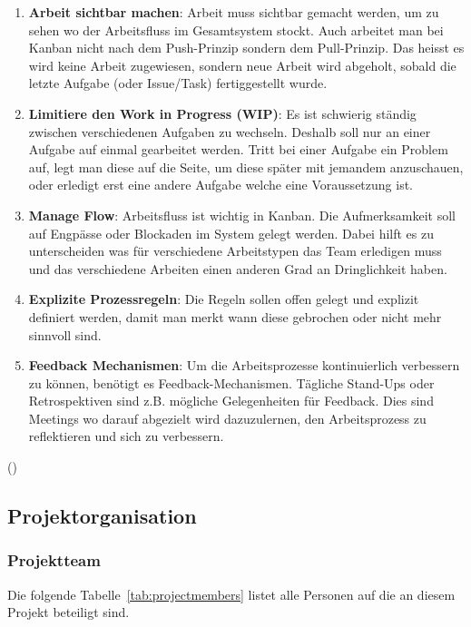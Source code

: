 \begin{enumerate}
    \item \textbf{Arbeit sichtbar machen}: Arbeit muss sichtbar gemacht werden, um zu sehen wo der Arbeitsfluss im Gesamtsystem stockt.
        Auch arbeitet man bei Kanban nicht nach dem Push-Prinzip sondern dem Pull-Prinzip.
        Das heisst es wird keine Arbeit zugewiesen, sondern neue Arbeit wird abgeholt, sobald die letzte Aufgabe (oder Issue/Task) fertiggestellt wurde.
    \item \textbf{Limitiere den Work in Progress (WIP)}: Es ist schwierig ständig zwischen verschiedenen Aufgaben zu wechseln. Deshalb soll nur an einer Aufgabe auf einmal gearbeitet werden.
    Tritt bei einer Aufgabe ein Problem auf, legt man diese auf die Seite, um diese später mit jemandem anzuschauen, oder erledigt erst eine andere Aufgabe welche eine Voraussetzung ist.
    \item \textbf{Manage Flow}: Arbeitsfluss ist wichtig in Kanban.
    Die Aufmerksamkeit soll auf Engpässe oder Blockaden im System gelegt werden.
    Dabei hilft es zu unterscheiden was für verschiedene Arbeitstypen das Team erledigen muss und das verschiedene Arbeiten einen anderen Grad an Dringlichkeit haben.
    \item \textbf{Explizite Prozessregeln}: Die Regeln sollen offen gelegt und explizit definiert werden, damit man merkt wann diese gebrochen oder nicht mehr sinnvoll sind.
    \item \textbf{Feedback Mechanismen}: Um die Arbeitsprozesse kontinuierlich verbessern zu können, benötigt es Feedback-Mechanismen. Tägliche Stand-Ups oder Retrospektiven sind z.B. mögliche Gelegenheiten für Feedback. Dies sind Meetings wo darauf abgezielt wird dazuzulernen, den Arbeitsprozess zu reflektieren und sich zu verbessern.
\end{enumerate}

(\cite[p.~17-22]{siegfried_kaltenecker_kanban_2013})

\subsection{Projektorganisation}

\subsubsection{Projektteam}

Die folgende Tabelle~\ref{tab:projectmembers} listet alle Personen auf die an diesem Projekt beteiligt sind.

